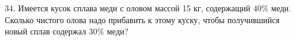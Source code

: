 34. Имеется кусок сплава меди с оловом массой 15 кг, содержащий $40\%$ меди. Сколько чистого олова надо прибавить к этому куску, чтобы получившийся новый сплав содержал $30\%$ меди?\\
